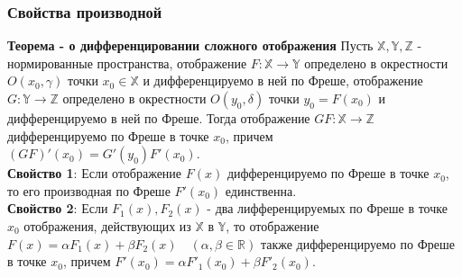 \documentclass[A4]{article}
\begin{document}
\subsubsection{Свойства производной}
\textbf{Теорема - о дифференцировании сложного отображения}
 Пусть $\mathbb{X}, \mathbb{Y}, \mathbb{Z}$ - нормированные пространства, отображение $F:\mathbb{X}\rightarrow\mathbb{Y}$ определено в окрестности $O(x_0,\gamma)$ точки $x_0\in\mathbb{X}$ и дифференцируемо в ней по Фреше, отображение $G:\mathbb{Y}\rightarrow\mathbb{Z}$ определено в окрестности $O(y_0,\delta)$ точки $y_0=F(x_0)$ и дифференцируемо в ней по Фреше. Тогда отображение $GF:\mathbb{X}\rightarrow\mathbb{Z}$ дифференцируемо по Фреше в точке $x_0$, причем $(GF)'(x_0)=G'(y_0)F'(x_0)$.\\
 \textbf{Свойство 1}: Если отображение $F(x)$ дифференцируемо по Фреше в точке $x_0$, то его производная по Фреше $F'(x_0)$ единственна.\\
 \textbf{Свойство 2}: Если $F_1(x), F_2(x)$ - два лифференцируемых по Фреше в точке $x_0$ отображения, действующих из $\mathbb{X}$ в $\mathbb{Y}$, то отображение $F(x)=\alpha F_1(x)+\beta F_2(x)\quad(\alpha,\beta\in\mathbb{R})$ также дифференцируемо по Фреше в точке $x_0$, причем $F'(x_0)=\alpha F'_1(x_0)+\beta F'_2(x_0)$.\\
\end{document}
